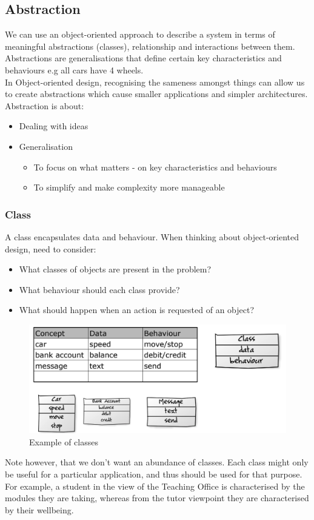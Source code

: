 \documentclass{article}
\begin{document}
\subsection{Abstraction}
We can use an object-oriented approach to describe a system in terms of meaningful abstractions (classes), relationship and interactions between them. \\ Abstractions are generalisations that define certain key characteristics and behaviours e.g all cars have 4 wheels. \\ In Object-oriented design, recognising the sameness amongst things can allow us to create abstractions which cause smaller applications and simpler architectures. \\ Abstraction is about: 
\begin{itemize}
    \item Dealing with ideas
    \item Generalisation 
    \begin{itemize}
        \item To focus on what matters - on key characteristics and behaviours
        \item To simplify and make complexity more manageable
    \end{itemize}
\end{itemize}
\subsubsection{Class}
A class encapsulates data and behaviour. When thinking about object-oriented design, need to consider:
\begin{itemize}
    \item What classes of objects are present in the problem?
    \item What behaviour should each class provide?
    \item What should happen when an action is requested of an object?
\end{itemize}
\begin{figure}[H]
\centering
\includegraphics[width = 0.5\linewidth]{Pictures/Screenshot 2023-01-25 at 11.43.59.png}
\caption{Example of classes}
\end{figure}
Note however, that we don't want an abundance of classes. Each class might only be useful for a particular application, and thus should be used for that purpose. For example, a student in the view of the Teaching Office is characterised by the modules they are taking, whereas from the tutor viewpoint they are characterised by their wellbeing.
\end{document}
